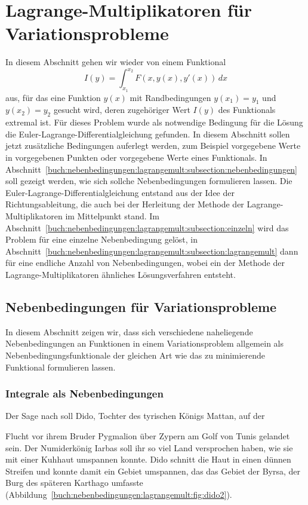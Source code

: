 %
%
%
\section{Lagrange-Multiplikatoren für Variationsprobleme
\label{buch:nebenbedingungen:section:lagrangemult}}
In diesem Abschnitt gehen wir wieder von einem Funktional
\begin{equation}
I(y)
=
\int_{x_1}^{x_2}
F(x,y(x),y'(x))
\,dx
\label{buch:nebenbedingungen:lagrangemult:eqn:}
\end{equation}
aus, für das eine Funktion $y(x)$ mit Randbedingungen $y(x_1)=y_1$ und
$y(x_2)=y_2$ gesucht wird, deren zugehöriger Wert $I(y)$ des
Funktionals extremal ist.
Für dieses Problem wurde als notwendige Bedingung für die Lösung die
Euler-Lagrange-Differentialgleichung gefunden.
In diesem Abschnitt sollen jetzt zusätzliche Bedingungen auferlegt 
werden, zum Beispiel vorgegebene Werte in vorgegebenen Punkten oder
vorgegebene Werte eines Funktionals.
In
Abschnitt~\ref{buch:nebenbedingungen:lagrangemult:subsection:nebenbedingungen}
soll gezeigt werden, wie sich sollche Nebenbedingungen formulieren
lassen.
Die Euler-Lagrange-Differentialgleichung entstand aus der Idee
der Richtungsableitung, die auch bei der Herleitung der Methode
der Lagrange-Multiplikatoren im Mittelpunkt stand.
Im
Abschnitt~\ref{buch:nebenbedingungen:lagrangemult:subsection:einzeln}
wird das Problem für eine einzelne Nebenbedingung gelöst, in
Abschnitt~\ref{buch:nebenbedingungen:lagrangemult:subsection:lagrangemult}
dann für eine endliche Anzahl von Nebenbedingungen, wobei ein der
Methode der Lagrange-Multiplikatoren ähnliches Lösungsverfahren entsteht.

%
%
\subsection{Nebenbedingungen für Variationsprobleme
\label{buch:nebenbedingungen:lagrangemult:subsection:nebenbedingungen}}
In diesem Abschnitt zeigen wir, dass sich verschiedene naheliegende
Nebenbedingungen an Funktionen in einem Variationsproblem allgemein
als Nebenbedingungsfunktionale der gleichen Art wie das zu minimierende
Funktional formulieren lassen.

%
%
\subsubsection{Integrale als Nebenbedingungen}
Der Sage nach soll Dido, Tochter des tyrischen Königs Mattan, auf der

Flucht vor ihrem Bruder Pygmalion über Zypern am Golf von Tunis 
gelandet sein.
%
%
%
%
Der Numiderkönig Iarbas soll ihr so viel Land versprochen haben, wie
sie mit einer Kuhhaut umspannen konnte.
%
Dido schnitt die Haut in einen dünnen Streifen und konnte damit ein
Gebiet umspannen, das das Gebiet der Byrsa, der Burg des späteren
Karthago umfasste
(Abbildung~\ref{buch:nebenbedingungen:lagrangemult:fig:dido2}).
%
%

